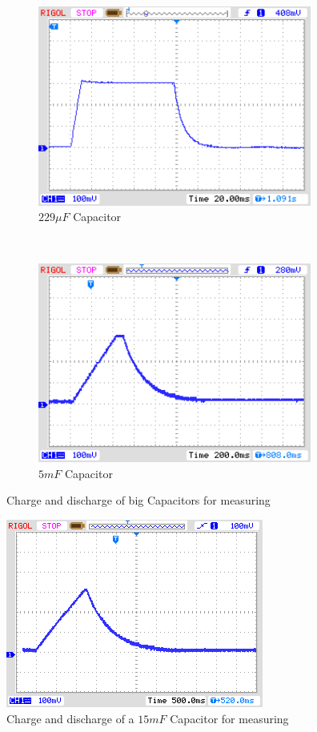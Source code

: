 \begin{figure}[H]
  \begin{subfigure}[b]{9cm}
    \centering
    \includegraphics[width=9cm]{../PNG/charge_229uF.png}
    \caption{\(229\mu F\) Capacitor}
    \label{pic:c229}
  \end{subfigure}
  ~
  \begin{subfigure}[b]{9cm}
    \centering
    \includegraphics[width=9cm]{../PNG/charge_5mF.png}
    \caption{\(5mF\) Capacitor}
    \label{pic:c5mF}
  \end{subfigure}
  \caption{Charge and discharge of big Capacitors for measuring}
\end{figure}

\begin{figure}[H]
  \centering
    \includegraphics[]{../PNG/charge_15mF.png}
  \caption{Charge and discharge of a \(15mF\) Capacitor for measuring}
  \label{pic:c15mF}
\end{figure}

